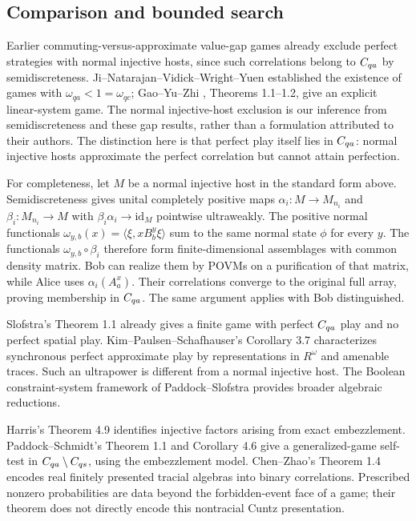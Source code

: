 \subsection{Comparison and bounded search}
Earlier commuting-versus-approximate value-gap games already exclude perfect strategies with normal injective hosts, since such correlations belong to $C_{qa}$ by semidiscreteness. Ji--Natarajan--Vidick--Wright--Yuen \cite{MIPRE} established the existence of games with $\omega_{qa}<1=\omega_{qc}$; Gao--Yu--Zhi \cite{GYZ}, Theorems 1.1--1.2, give an explicit linear-system game. The normal injective-host exclusion is our inference from semidiscreteness and these gap results, rather than a formulation attributed to their authors. The distinction here is that perfect play itself lies in $C_{qa}$: normal injective hosts approximate the perfect correlation but cannot attain perfection.

For completeness, let $M$ be a normal injective host in the standard form above. Semidiscreteness gives unital completely positive maps $\alpha_i:M\to M_{n_i}$ and $\beta_i:M_{n_i}\to M$ with $\beta_i\alpha_i\to\mathrm{id}_M$ pointwise ultraweakly. The positive normal functionals $\omega_{y,b}(x)=\langle\xi,xB_b^y\xi\rangle$ sum to the same normal state $\phi$ for every $y$. The functionals $\omega_{y,b}\circ\beta_i$ therefore form finite-dimensional assemblages with common density matrix. Bob can realize them by POVMs on a purification of that matrix, while Alice uses $\alpha_i(A_a^x)$. Their correlations converge to the original full array, proving membership in $C_{qa}$. The same argument applies with Bob distinguished.

Slofstra's Theorem 1.1 \cite{Slofstra} already gives a finite game with perfect $C_{qa}$ play and no perfect spatial play. Kim--Paulsen--Schafhauser's Corollary 3.7 \cite{KPS} characterizes synchronous perfect approximate play by representations in $R^\omega$ and amenable traces. Such an ultrapower is different from a normal injective host. The Boolean constraint-system framework of Paddock--Slofstra \cite{PadSlo} provides broader algebraic reductions.

Harris's Theorem 4.9 \cite{Harris} identifies injective factors arising from exact embezzlement. Paddock--Schmidt's Theorem 1.1 and Corollary 4.6 \cite{PadSch} give a generalized-game self-test in $C_{qa}\setminus C_{qs}$, using the embezzlement model. Chen--Zhao's Theorem 1.4 \cite{ChenZhao} encodes real finitely presented tracial algebras into binary correlations. Prescribed nonzero probabilities are data beyond the forbidden-event face of a game; their theorem does not directly encode this nontracial Cuntz presentation.

